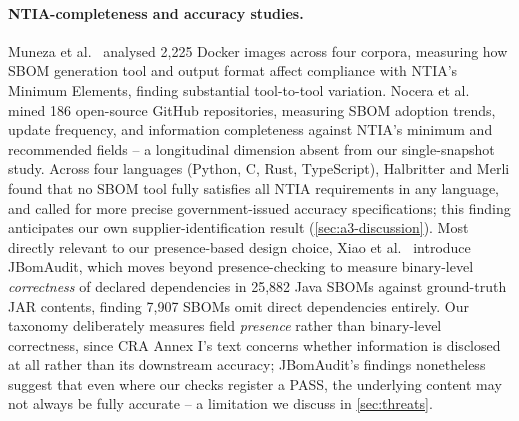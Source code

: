 \documentclass[11pt]{article}
\begin{document}
\paragraph{NTIA-completeness and accuracy studies.} Muneza et al.\ \cite{muneza2025} analysed 2,225 Docker images across four corpora, measuring how SBOM generation tool and output format affect compliance with NTIA's Minimum Elements, finding substantial tool-to-tool variation. Nocera et al.\ \cite{nocera2025jss} mined 186 open-source GitHub repositories, measuring SBOM adoption trends, update frequency, and information completeness against NTIA's minimum and recommended fields -- a longitudinal dimension absent from our single-snapshot study. Across four languages (Python, C, Rust, TypeScript), Halbritter and Merli \cite{halbritter2024} found that no SBOM tool fully satisfies all NTIA requirements in any language, and called for more precise government-issued accuracy specifications; this finding anticipates our own supplier-identification result (\cref{sec:a3-discussion}). Most directly relevant to our presence-based design choice, Xiao et al.\ \cite{jbomaudit} introduce JBomAudit, which moves beyond presence-checking to measure binary-level \emph{correctness} of declared dependencies in 25,882 Java SBOMs against ground-truth JAR contents, finding 7,907 SBOMs omit direct dependencies entirely. Our taxonomy deliberately measures field \emph{presence} rather than binary-level correctness, since CRA Annex I's text concerns whether information is disclosed at all rather than its downstream accuracy; JBomAudit's findings nonetheless suggest that even where our checks register a PASS, the underlying content may not always be fully accurate -- a limitation we discuss in \cref{sec:threats}.
\end{document}
